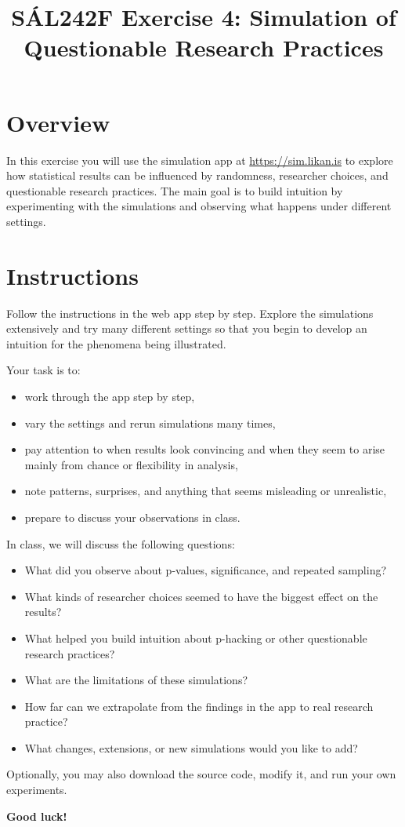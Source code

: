 \documentclass[11pt]{article}
\title{SÁL242F Exercise 4: Simulation of Questionable Research Practices}
\author{}
\date{}
\begin{document}
\maketitle

\section*{Overview}

In this exercise you will use the simulation app at \url{https://sim.likan.is} to explore how statistical results can be influenced by randomness, researcher choices, and questionable research practices. The main goal is to build intuition by experimenting with the simulations and observing what happens under different settings.

\section*{Instructions}

Follow the instructions in the web app step by step. Explore the simulations extensively and try many different settings so that you begin to develop an intuition for the phenomena being illustrated.

\noindent
Your task is to:
\begin{itemize}
    \item work through the app step by step,
    \item vary the settings and rerun simulations many times,
    \item pay attention to when results look convincing and when they seem to arise mainly from chance or flexibility in analysis,
    \item note patterns, surprises, and anything that seems misleading or unrealistic,
    \item prepare to discuss your observations in class.
\end{itemize}

\noindent
In class, we will discuss the following questions:
\begin{itemize}
    \item What did you observe about p-values, significance, and repeated sampling?
    \item What kinds of researcher choices seemed to have the biggest effect on the results?
    \item What helped you build intuition about p-hacking or other questionable research practices?
    \item What are the limitations of these simulations?
    \item How far can we extrapolate from the findings in the app to real research practice?
    \item What changes, extensions, or new simulations would you like to add?
\end{itemize}

\noindent
Optionally, you may also download the source code, modify it, and run your own experiments.

\noindent\textbf{Good luck!}
\end{document}
